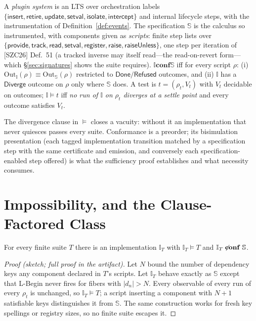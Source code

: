 \documentclass[sigplan,screen,review,nonacm]{acmart}
\newcommand{\Spec}{\ensuremath{\mathbb S}}
\newcommand{\Impl}{\ensuremath{\mathbb I}}
\newcommand{\conf}{\mathrel{\mathbf{conf}}}
\newcommand{\Out}{\mathrm{Out}}
\newcommand{\SZC}{[SZC26]}
\begin{document}
\begin{definition}\label{def:conf}
A \emph{plugin system} is an LTS over orchestration labels
$\{\mathsf{insert}, \mathsf{retire}, \mathsf{update}, \mathsf{setval},
\mathsf{isolate}, \mathsf{intercept}\}$ and internal lifecycle steps, with the
instrumentation of Definition~\ref{def:events}. The specification \Spec{} is
the calculus so instrumented, with components given as \emph{scripts}: finite
step lists over
$\{\mathsf{provide}, \mathsf{track}, \mathsf{read}, \mathsf{setval},
\mathsf{register}, \mathsf{raise}, \mathsf{raiseUnless}\}$, one step per
iteration of \SZC{} Def.~51 (a tracked inverse may itself read---the
read-on-revert form---which \S\ref{sec:signatures} shows the suite requires).
$\Impl \conf \Spec$ iff for every script $\rho$:
(i) $\Out_\Impl(\rho) \equiv \Out_\Spec(\rho)$ restricted to
$\mathsf{Done}/\mathsf{Refused}$ outcomes, and
(ii) $\Impl$ has a $\mathsf{Diverge}$ outcome on $\rho$ only where \Spec{}
does. A test is $t = (\rho_t, V_t)$ with $V_t$ decidable on outcomes;
$\Impl \models t$ iff \emph{no run of $\Impl$ on $\rho_t$ diverges at a settle
point} and every outcome satisfies $V_t$.
\end{definition}

The divergence clause in $\models$ closes a vacuity: without it an
implementation that never quiesces passes every suite. Conformance is a
preorder; its bisimulation presentation (each tagged implementation transition
matched by a specification step with the same certificate and emission, and
conversely each specification-enabled step offered) is what the sufficiency
proof establishes and what necessity consumes.

\section{Impossibility, and the Clause-Factored Class}\label{sec:cf}

\begin{theorem}
\label{thm:impossibility}
For every finite suite $T$ there is an implementation $\Impl_T$ with
$\Impl_T \models T$ and $\Impl_T \not\conf \Spec$.
\end{theorem}

\begin{proof}[Proof (sketch; full proof in the artifact)]
Let $N$ bound the number of dependency keys any component declared in $T$'s
scripts. Let $\Impl_T$ behave exactly as \Spec{} except that L\mbox{-}Begin
never fires for fibers with $|d_n| > N$. Every observable of every run of every
$\rho_t$ is unchanged, so $\Impl_T \models T$; a script inserting a component
with $N{+}1$ satisfiable keys distinguishes it from \Spec. The same
construction works for fresh key spellings or registry sizes, so no finite
suite escapes it.
\end{proof}
\end{document}
